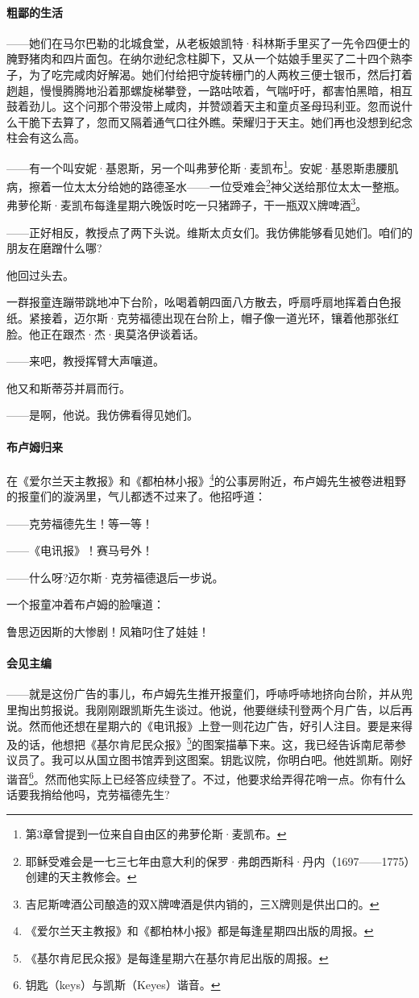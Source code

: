 \paragraph*{粗鄙的生活}
\par ——她们在马尔巴勒的北城食堂，从老板娘凯特·科林斯手里买了一先令四便士的腌野猪肉和四片面包。在纳尔逊纪念柱脚下，又从一个姑娘手里买了二十四个熟李子，为了吃完咸肉好解渴。她们付给把守旋转栅门的人两枚三便士银币，然后打着趔趄，慢慢腾腾地沿着那螺旋梯攀登，一路咕哝着，气喘吁吁，都害怕黑暗，相互鼓着劲儿。这个问那个带没带上咸肉，并赞颂着天主和童贞圣母玛利亚。忽而说什么干脆下去算了，忽而又隔着通气口往外瞧。荣耀归于天主。她们再也没想到纪念柱会有这么高。
\par ——有一个叫安妮·基恩斯，另一个叫弗萝伦斯·麦凯布\footnote{第3章曾提到一位来自自由区的弗萝伦斯·麦凯布。}。安妮·基恩斯患腰肌病，擦着一位太太分给她的路德圣水——一位受难会\footnote{耶稣受难会是一七三七年由意大利的保罗·弗朗西斯科·丹内（1697——1775）创建的天主教修会。}神父送给那位太太一整瓶。弗萝伦斯·麦凯布每逢星期六晚饭时吃一只猪蹄子，干一瓶双X牌啤酒\footnote{吉尼斯啤酒公司酿造的双X牌啤酒是供内销的，三X牌则是供出口的。}。
\par ——正好相反，教授点了两下头说。维斯太贞女们。我仿佛能够看见她们。咱们的朋友在磨蹭什么哪?
\par 他回过头去。
\par 一群报童连蹦带跳地冲下台阶，吆喝着朝四面八方散去，呼扇呼扇地挥着白色报纸。紧接着，迈尔斯·克劳福德出现在台阶上，帽子像一道光环，镶着他那张红脸。他正在跟杰·杰·奥莫洛伊谈着话。
\par ——来吧，教授挥臂大声嚷道。
\par 他又和斯蒂芬并肩而行。
\par ——是啊，他说。我仿佛看得见她们。
\paragraph*{布卢姆归来}
\par 在《爱尔兰天主教报》和《都柏林小报》\footnote{《爱尔兰天主教报》和《都柏林小报》都是每逢星期四出版的周报。}的公事房附近，布卢姆先生被卷进粗野的报童们的漩涡里，气儿都透不过来了。他招呼道：
\par ——克劳福德先生！等一等！
\par ——《电讯报》！赛马号外！
\par ——什么呀?迈尔斯·克劳福德退后一步说。
\par 一个报童冲着布卢姆的脸嚷道：
\par 鲁思迈因斯的大惨剧！风箱叼住了娃娃！
\paragraph*{会见主编}
\par ——就是这份广告的事儿，布卢姆先生推开报童们，呼哧呼哧地挤向台阶，并从兜里掏出剪报说。我刚刚跟凯斯先生谈过。他说，他要继续刊登两个月广告，以后再说。然而他还想在星期六的《电讯报》上登一则花边广告，好引人注目。要是来得及的话，他想把《基尔肯尼民众报》\footnote{《基尔肯尼民众报》是每逢星期六在基尔肯尼出版的周报。}的图案描摹下来。这，我已经告诉南尼蒂参议员了。我可以从国立图书馆弄到这图案。钥匙议院，你明白吧。他姓凯斯。刚好谐音\footnote{钥匙（keys）与凯斯（Keyes）谐音。}。然而他实际上已经答应续登了。不过，他要求给弄得花哨一点。你有什么话要我捎给他吗，克劳福德先生?
